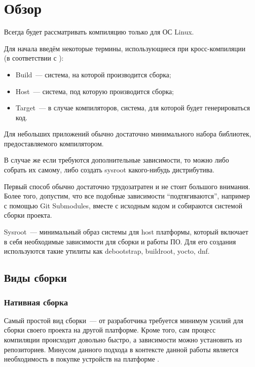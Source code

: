
\section{Обзор}
\label{sec:relatedworks}

Всегда будет рассматривать компиляцию только для ОС Linux.

Для начала введём некоторые термины, использующиеся при кросс-компиляции (в соответствии с \cite{CrossCompilationAutomake}):
\begin{itemize}
	\item Build~--- система, на которой производится сборка;
	\item Host~--- система, под которую производится сборка;
	\item Target~--- в случае компиляторов, система, для которой будет генерироваться код.
\end{itemize}


Для небольших приложений  обычно достаточно минимального набора библиотек, предоставляемого компилятором.

В случае же если требуются дополнительные зависимости, то можно либо собрать их самому, либо создать sysroot какого-нибудь дистрибутива.

Первый способ обычно достаточно трудозатратен и не стоит большого внимания.
Более того, допустим, что все подобные зависимости \enquote{подтягиваются}, например с помощью Git Submodules, вместе с исходным кодом и собираются системой сборки проекта.

Sysroot~--- минимальный образ системы для host платформы, который включает в себя необходимые зависимости для сборки и работы ПО. 
Для его создания используются такие утилиты как debootstrap, buildroot, yocto, dnf. 

\subsection{Виды сборки}

\subsubsection{Нативная сборка}

Самый простой вид сборки~--- от разработчика требуется минимум усилий для сборки своего проекта на другой платформе.
Кроме того, сам процесс компиляции происходит довольно быстро, а зависимости можно установить из репозиториев.
Минусом данного подхода в контексте данной работы является необходимость в покупке устройств на платформе \riscv{}.

